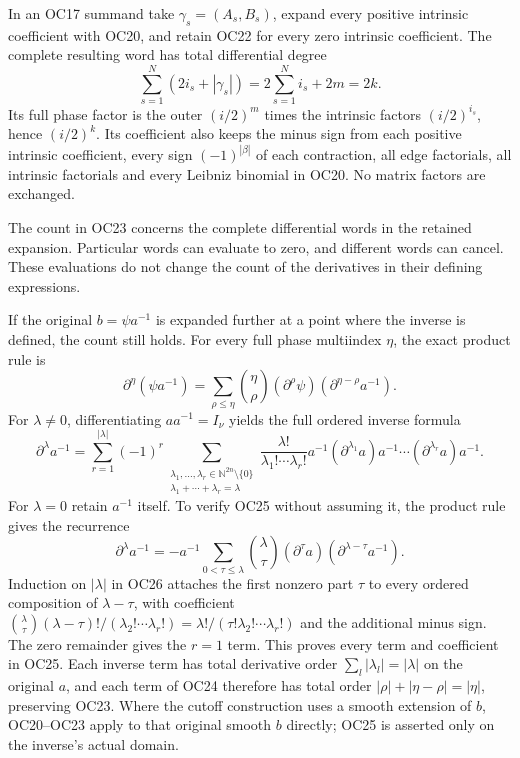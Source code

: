 \documentclass[
  11pt,
]{article}
\begin{document}
In an OC17 summand take \(\gamma_s=(A_s,B_s)\), expand every positive
intrinsic coefficient with OC20, and retain OC22 for every zero
intrinsic coefficient. The complete resulting word has total
differential degree \[
\sum_{s=1}^{N}(2i_s+|\gamma_s|)
=2\sum_{s=1}^{N}i_s+2m
=\boxed{2k}.
\tag{OC23}
\] Its full phase factor is the outer \((i/2)^m\) times the intrinsic
factors \((i/2)^{i_s}\), hence \((i/2)^k\). Its coefficient also keeps
the minus sign from each positive intrinsic coefficient, every sign
\((-1)^{|\beta|}\) of each contraction, all edge factorials, all
intrinsic factorials and every Leibniz binomial in OC20. No matrix
factors are exchanged.

The count in OC23 concerns the complete differential words in the
retained expansion. Particular words can evaluate to zero, and different
words can cancel. These evaluations do not change the count of the
derivatives in their defining expressions.

If the original \(b=\psi a^{-1}\) is expanded further at a point where
the inverse is defined, the count still holds. For every full phase
multiindex \(\eta\), the exact product rule is \[
\partial^\eta(\psi a^{-1})
=\sum_{\rho\le\eta}\binom\eta\rho
   (\partial^\rho\psi)(\partial^{\eta-\rho}a^{-1}).
\tag{OC24}
\] For \(\lambda\ne0\), differentiating \(aa^{-1}=I_\nu\) yields the
full ordered inverse formula \[
\partial^\lambda a^{-1}
=\sum_{r=1}^{|\lambda|}(-1)^r
 \sum_{\substack{\lambda_1,\ldots,\lambda_r\in\mathbb N^{2n}\setminus\{0\}\\
                 \lambda_1+\cdots+\lambda_r=\lambda}}
 \frac{\lambda!}{\lambda_1!\cdots\lambda_r!}
 a^{-1}(\partial^{\lambda_1}a)a^{-1}
       \cdots(\partial^{\lambda_r}a)a^{-1}.
\tag{OC25}
\] For \(\lambda=0\) retain \(a^{-1}\) itself. To verify OC25 without
assuming it, the product rule gives the recurrence \[
\partial^\lambda a^{-1}
=-a^{-1}\sum_{0<\tau\le\lambda}
   \binom\lambda\tau(\partial^\tau a)
                       (\partial^{\lambda-\tau}a^{-1}).
\tag{OC26}
\] Induction on \(|\lambda|\) in OC26 attaches the first nonzero part
\(\tau\) to every ordered composition of \(\lambda-\tau\), with
coefficient
\(\binom\lambda\tau(\lambda-\tau)!/(\lambda_2!\cdots\lambda_r!)
=\lambda!/(\tau!\lambda_2!\cdots\lambda_r!)\) and the additional minus
sign. The zero remainder gives the \(r=1\) term. This proves every term
and coefficient in OC25. Each inverse term has total derivative order
\(\sum_l|\lambda_l|=|\lambda|\) on the original \(a\), and each term of
OC24 therefore has total order \(|\rho|+|\eta-\rho|=|\eta|\), preserving
OC23. Where the cutoff construction uses a smooth extension of \(b\),
OC20--OC23 apply to that original smooth \(b\) directly; OC25 is
asserted only on the inverse's actual domain.
\end{document}
